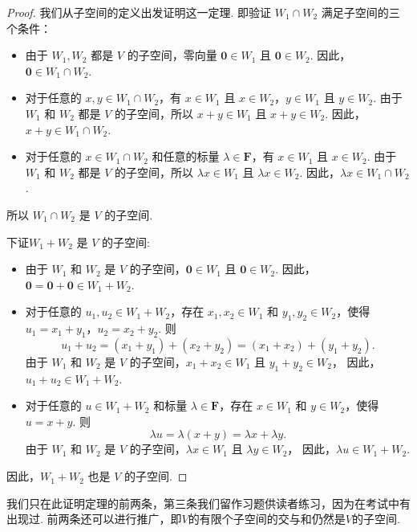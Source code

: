 \begin{proof}
    我们从子空间的定义出发证明这一定理.
    即验证 $W_1 \cap W_2$ 满足子空间的三个条件：


    \begin{itemize}
        \item
        由于 $W_1, W_2$ 都是 $V$ 的子空间，零向量 $\mathbf{0} \in W_1$ 且 $\mathbf{0} \in W_2$. 因此，$\mathbf{0} \in W_1 \cap W_2$.

        \item
        对于任意的 $x, y \in W_1 \cap W_2$，有 $x \in W_1$ 且 $x \in W_2$，$y \in W_1$ 且 $y \in W_2$.
        由于 $W_1$ 和 $W_2$ 都是 $V$ 的子空间，所以 $x + y \in W_1$ 且 $x + y \in W_2$.
        因此，$x + y \in W_1 \cap W_2$.

        \item
        对于任意的 $x \in W_1 \cap W_2$ 和任意的标量 $\lambda \in \mathbf{F}$，有 $x \in W_1$ 且 $x \in W_2$.
        由于 $W_1$ 和 $W_2$ 都是 $V$ 的子空间，所以 $\lambda x \in W_1$ 且 $\lambda x \in W_2$.
        因此，$\lambda x \in W_1 \cap W_2$.
    \end{itemize}

    所以 $W_1 \cap W_2$ 是 $V$ 的子空间.


    下证$W_1 + W_2$ 是 $V$ 的子空间:
    \begin{itemize}
        \item
        由于 $W_1$ 和 $W_2$ 是 $V$ 的子空间，$\mathbf{0} \in W_1$ 且 $\mathbf{0} \in W_2$.
        因此，$\mathbf{0} = \mathbf{0} + \mathbf{0} \in W_1 + W_2$.

        \item
        对于任意的 $u_1, u_2 \in W_1 + W_2$，存在 $x_1, x_2 \in W_1$ 和 $y_1, y_2 \in W_2$，使得 $u_1 = x_1 + y_1$，$u_2 = x_2 + y_2$.
        则
        $$
        u_1 + u_2 = (x_1 + y_1) + (x_2 + y_2) = (x_1 + x_2) + (y_1 + y_2).
        $$
        由于 $W_1$ 和 $W_2$ 是 $V$ 的子空间，$x_1 + x_2 \in W_1$ 且 $y_1 + y_2 \in W_2$，
        因此，$u_1 + u_2 \in W_1 + W_2$.

        \item
        对于任意的 $u \in W_1 + W_2$ 和标量 $\lambda \in \mathbf{F}$，存在 $x \in W_1$ 和 $y \in W_2$，使得 $u = x + y$.
        则
        $$
        \lambda u = \lambda (x + y) = \lambda x + \lambda y.
        $$
        由于 $W_1$ 和 $W_2$ 是 $V$ 的子空间，$\lambda x \in W_1$ 且 $\lambda y \in W_2$，
        因此，$\lambda u \in W_1 + W_2$.
    \end{itemize}

    因此，$W_1 + W_2$ 也是 $V$ 的子空间.
\end{proof}
我们只在此证明定理的前两条，第三条我们留作习题供读者练习，因为在考试中有出现过. 前两条还可以进行推广，即$V$的有限个子空间的交与和仍然是$V$的子空间.

